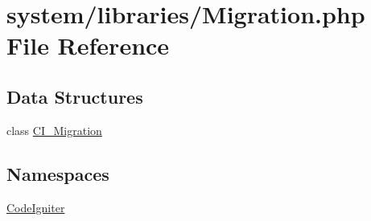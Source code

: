 \hypertarget{system_2libraries_2migration_8php}{\section{system/libraries/\-Migration.php File Reference}
\label{system_2libraries_2migration_8php}
}
\subsection*{Data Structures}
\begin{DoxyCompactItemize}
\item 
class \hyperlink{class_c_i___migration}{C\-I\-\_\-\-Migration}
\end{DoxyCompactItemize}
\subsection*{Namespaces}
\begin{DoxyCompactItemize}
\item 
\hyperlink{namespace_code_igniter}{Code\-Igniter}
\end{DoxyCompactItemize}
